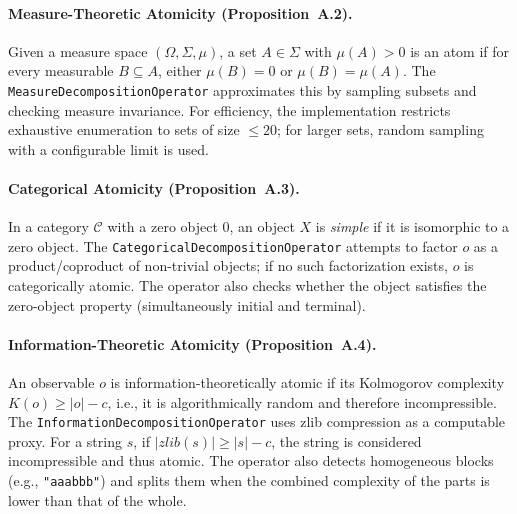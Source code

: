 \paragraph{Measure-Theoretic Atomicity (Proposition~A.2).}
Given a measure space $(\Omega, \Sigma, \mu)$, a set $A \in \Sigma$ with $\mu(A) > 0$ is an atom if for every measurable $B \subseteq A$, either $\mu(B) = 0$ or $\mu(B) = \mu(A)$. The \texttt{MeasureDecompositionOperator} approximates this by sampling subsets and checking measure invariance. For efficiency, the implementation restricts exhaustive enumeration to sets of size $\le 20$; for larger sets, random sampling with a configurable limit is used.

\paragraph{Categorical Atomicity (Proposition~A.3).}
In a category $\mathcal{C}$ with a zero object $0$, an object $X$ is \emph{simple} if it is isomorphic to a zero object. The \texttt{CategoricalDecompositionOperator} attempts to factor $o$ as a product/coproduct of non-trivial objects; if no such factorization exists, $o$ is categorically atomic. The operator also checks whether the object satisfies the zero-object property (simultaneously initial and terminal).

\paragraph{Information-Theoretic Atomicity (Proposition~A.4).}
An observable $o$ is information-theoretically atomic if its Kolmogorov complexity $K(o) \ge |o| - c$, i.e., it is algorithmically random and therefore incompressible. The \texttt{InformationDecompositionOperator} uses zlib compression as a computable proxy. For a string $s$, if $|zlib(s)| \ge |s| - c$, the string is considered incompressible and thus atomic. The operator also detects homogeneous blocks (e.g., \texttt{"aaabbb"}) and splits them when the combined complexity of the parts is lower than that of the whole.

